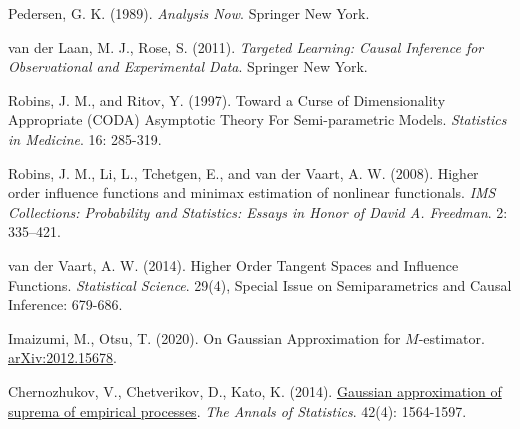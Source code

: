 \documentclass[uplatex,dvipdfmx]{jsreport}
\begin{document}
\begin{thebibliography}{99}
    \item
    Pedersen, G. K. (1989). \textit{Analysis Now}. Springer New York.
    \item
    van der Laan, M. J., Rose, S. (2011). \textit{Targeted Learning: Causal Inference for Observational and Experimental Data}. Springer New York.
    \item
    Robins, J. M., and Ritov, Y. (1997). Toward a Curse of Dimensionality Appropriate (CODA) Asymptotic Theory For Semi-parametric Models. \textit{Statistics in Medicine}. 16: 285-319.
    \item
    Robins, J. M., Li, L., Tchetgen, E., and van der Vaart, A. W. (2008). Higher order influence functions and minimax estimation of nonlinear functionals. \textit{IMS Collections: Probability and Statistics: Essays in Honor of David A. Freedman}. 2: 335–421.
    \item
    van der Vaart, A. W. (2014). Higher Order Tangent Spaces and Influence Functions. \textit{Statistical Science}. 29(4), Special Issue on Semiparametrics and Causal Inference: 679-686.
    \item
    Imaizumi, M., Otsu, T. (2020). On Gaussian Approximation for $M$-estimator. \href{https://arxiv.org/abs/2012.15678}{arXiv:2012.15678}.
    \item
    Chernozhukov, V., Chetverikov, D., Kato, K. (2014). \href{https://arxiv.org/abs/1212.6885}{Gaussian approximation of suprema of empirical processes}. \textit{The Annals of Statistics}. 42(4): 1564-1597.
\end{thebibliography}
\end{document}

